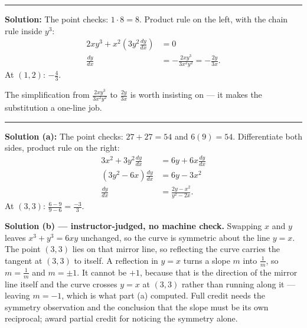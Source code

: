 \documentclass[12pt]{article}
\begin{document}
\vspace{0.15cm}\noindent\rule{\linewidth}{0.2pt}\vspace{0.15cm}


\textbf{Solution:} The point checks: $1 \cdot 8 = 8$. Product rule on the left,
with the chain rule inside $y^3$:
\begin{align*}
  2xy^3 + x^2\left(3y^2\frac{dy}{dx}\right) &= 0 \\
  \frac{dy}{dx} &= -\frac{2xy^3}{3x^2y^2} = -\frac{2y}{3x} .
\end{align*}
At $(1,2)$: $-\frac{4}{3}$. 

The simplification from $\frac{2xy^3}{3x^2y^2}$ to $\frac{2y}{3x}$ is worth
insisting on --- it makes the substitution a one-line job.

\vspace{0.15cm}\noindent\rule{\linewidth}{0.2pt}\vspace{0.15cm}


\textbf{Solution (a):} The point checks: $27 + 27 = 54$ and $6(9) = 54$.
Differentiate both sides, product rule on the right:
\begin{align*}
  3x^2 + 3y^2\frac{dy}{dx} &= 6y + 6x\frac{dy}{dx} \\
  \left(3y^2 - 6x\right)\frac{dy}{dx} &= 6y - 3x^2 \\
  \frac{dy}{dx} &= \frac{2y - x^2}{y^2 - 2x} .
\end{align*}
At $(3,3)$: $\frac{6-9}{9-6} = \frac{-3}{3}$. 

\textbf{Solution (b) --- instructor-judged, no machine check.} Swapping $x$ and
$y$ leaves $x^3+y^3=6xy$ unchanged, so the curve is symmetric about the line
$y = x$. The point $(3,3)$ lies on that mirror line, so reflecting the curve
carries the tangent at $(3,3)$ to itself. A reflection in $y = x$ turns a slope
$m$ into $\frac{1}{m}$, so $m = \frac{1}{m}$ and $m = \pm 1$. It cannot be $+1$,
because that is the direction of the mirror line itself and the curve crosses
$y=x$ at $(3,3)$ rather than running along it --- leaving $m = -1$, which is
what part (a) computed. Full credit needs the symmetry observation and the
conclusion that the slope must be its own reciprocal; award partial credit for
noticing the symmetry alone.
\end{document}
